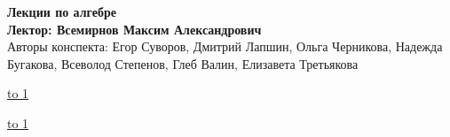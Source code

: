 \documentclass[12pt,a4paper]{article}
\begin{document}
\begin{center}
  {\Large \bf Лекции по алгебре} \\ 
  \vspace{0.5em}
  {\Large \bf Лектор: Всемирнов Максим Александрович} \\
  \vspace{0.5em}
  {\large Авторы конспекта: Егор Суворов, Дмитрий Лапшин, Ольга Черникова, Надежда Бугакова, Всеволод Степенов, Глеб Валин, Елизавета Третьякова} \\

\end{center}

\vspace{-1em}
\noindent \underline{\hbox to 1\textwidth{{ } \hfil{ } \hfil{ } }}

\vspace{1em}
\tableofcontents
\pagebreak



























 























\noindent \underline{\hbox to 1\textwidth{{ } \hfil{ } \hfil{ } }}
\end{document}
